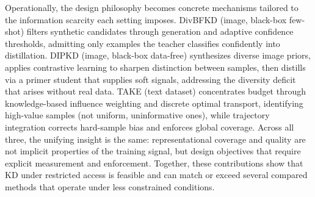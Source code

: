 \begin{foldable}
  Operationally, the design philosophy becomes concrete mechanisms tailored to the information scarcity each setting imposes.
  \ac{DivBFKD} (image, black-box few-shot) filters synthetic candidates through generation and adaptive confidence thresholds, admitting only examples the teacher classifies confidently into distillation.
  \ac{DIPKD} (image, black-box data-free) synthesizes diverse image priors, applies contrastive learning to sharpen distinction between samples, then distills via a primer student that supplies soft signals, addressing the diversity deficit that arises without real data.
  \ac{TAKE} (text dataset) concentrates budget through knowledge-based influence weighting and discrete optimal transport, identifying high-value samples (not uniform, uninformative ones), while trajectory integration corrects hard-sample bias and enforces global coverage.
  Across all three, the unifying insight is the same: representational coverage and quality are not implicit properties of the training signal, but design objectives that require explicit measurement and enforcement.
  Together, these contributions show that \ac{KD} under restricted access is feasible and can match or exceed several compared methods that operate under less constrained conditions.
\end{foldable}

